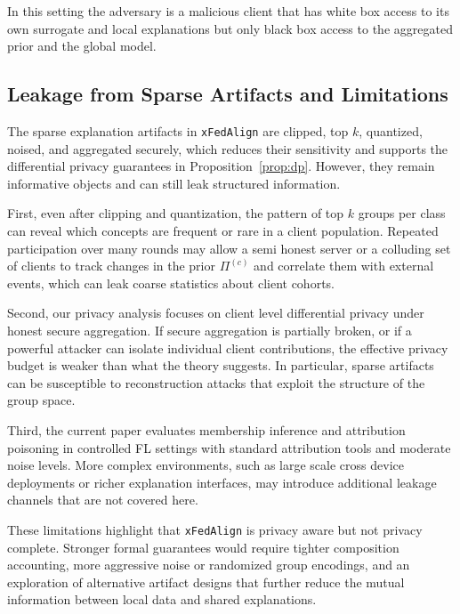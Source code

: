 \documentclass{article}
\theoremstyle{plain}
\theoremstyle{definition}
\theoremstyle{remark}
\begin{document}
In this setting the adversary is a malicious client that has white box access to its own surrogate and local explanations but only black box access to the aggregated prior and the global model.


\subsection{Leakage from Sparse Artifacts and Limitations}
\label{sec:threat-limitations}

The sparse explanation artifacts in \texttt{xFedAlign} are clipped, top $k$, quantized, noised, and aggregated securely, which reduces their sensitivity and supports the differential privacy guarantees in Proposition~\ref{prop:dp}. However, they remain informative objects and can still leak structured information.

First, even after clipping and quantization, the pattern of top $k$ groups per class can reveal which concepts are frequent or rare in a client population. Repeated participation over many rounds may allow a semi honest server or a colluding set of clients to track changes in the prior $\Pi^{(c)}$ and correlate them with external events, which can leak coarse statistics about client cohorts.

Second, our privacy analysis focuses on client level differential privacy under honest secure aggregation. If secure aggregation is partially broken, or if a powerful attacker can isolate individual client contributions, the effective privacy budget is weaker than what the theory suggests. In particular, sparse artifacts can be susceptible to reconstruction attacks that exploit the structure of the group space.

Third, the current paper evaluates membership inference and attribution poisoning in controlled FL settings with standard attribution tools and moderate noise levels. More complex environments, such as large scale cross device deployments or richer explanation interfaces, may introduce additional leakage channels that are not covered here.

These limitations highlight that \texttt{xFedAlign} is privacy aware but not privacy complete. Stronger formal guarantees would require tighter composition accounting, more aggressive noise or randomized group encodings, and an exploration of alternative artifact designs that further reduce the mutual information between local data and shared explanations.
\end{document}
